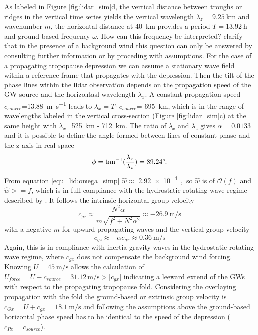 As labeled in Figure \ref{fig:lidar_sim}d, the vertical distance between troughs or ridges in the vertical time series yields the vertical wavelength $\lambda_z=\SI{9.25}{\kilo \meter}$ and wavenumber $m$, the horizontal distance at \SI{40}{\kilo \meter} provides a period $T=\SI{13.92}{\hour}$ and ground-based frequency $\omega$. How can this frequency be interpreted? \textcite[]{dornbrack_interpretation_2017} clarify that in the presence of a background wind this question can only be answered by consulting further information or by proceding with assumptions. For the case of a propagating tropopause depression we can assume a stationary wave field within a reference frame that propagates with the depression. Then the tilt of the phase lines within the lidar observation depends on the propagation speed of the GW source and the horizontasl wavelength $\lambda_x$. A constant propagation speed $c_{source}$=\SI{13.88}{\meter \per \second} leads to $\lambda_x = T \cdot c_{source}$= \SI{695}{\kilo \meter}, which is in the range of wavelengths labeled in the vertical cross-section (Figure \ref{fig:lidar_sim}c) at the same height with $\lambda_x$=\SI{525}{\kilo \meter} - \SI{712}{\kilo \meter}. The ratio of $\lambda_x$ and $\lambda_z$ gives $\alpha=0.0133$ and it is possible to define the angle formed between lines of constant phase and the z-axis in real space
\begin{equation}
    \phi = \tan^{-1}(\frac{\lambda_x}{\lambda_z})=89.24\degree.
    \label{equ_lid:phi}
\end{equation}
From equation \ref{equ_lid:omega_simp} $\hat{w}\approx$ \SI{2.92e-4}, so $\hat{w}$ is of $\mathcal{O}(f)$ and $\hat{w}>=f$, which is in full compliance with the hydrostatic rotating wave regime described by \textcite[]{gill_atmosphere-ocean_1982}. It follows the intrinsic horizontal group velocity
\begin{equation}
    c_{gx} \approx \frac{N^2 \alpha}{m \sqrt{f^2+N^2 \alpha^2}} \approx \SI{-26.9}{\meter\per\second} 
    \label{equ_lid:cgh}
\end{equation}
with a negative $m$ for upward propagating waves and the vertical group velocity
\begin{equation}
    c_{gz} \approx -\alpha c_{gx} \approx \SI{0.36}{\meter\per\second}
    \label{equ_lid:cgz}
\end{equation}
Again, this is in compliance with inertia-gravity waves in the hydrostatic rotating wave regime, where $c_{gx}$ does not compensate the background wind forcing. Knowing $U=\SI{45}{\meter\per\second}$ allows the calculation of $U_{force}=U-c_{source}=\SI{31.12}{\meter\per\second}>\lvert c_{gx} \rvert$ indicating a leeward extend of the GWs with respect to the propagating tropopause fold. Considering the overlaying propagation with the fold the ground-based or extrinsic group velocity is $c_{Gx}=U+c_{gx}=\SI{18.1}{\meter\per\second}$ and following the assumptions above the ground-based horizontal phase speed has to be identical to the speed of the depression ($c_{Px} = c_{source}$). \\
